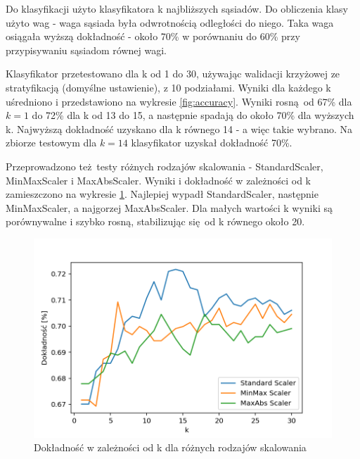 \documentclass[12pt]{article}
\begin{document}
Do klasyfikacji użyto klasyfikatora k najbliższych sąsiadów. Do obliczenia klasy użyto wag - waga sąsiada była odwrotnością odległości do niego. Taka waga osiągała wyższą dokładność - około 70\% w porównaniu do 60\% przy przypisywaniu sąsiadom równej wagi.

Klasyfikator przetestowano dla k od 1 do 30, używając walidacji krzyżowej ze stratyfikacją (domyślne ustawienie), z 10 podziałami. Wyniki dla każdego k uśredniono i przedstawiono na wykresie \ref{fig:accuracy}. Wyniki rosną od 67\% dla $k=1$ do 72\% dla k od 13 do 15, a następnie spadają do około 70\% dla wyższych k. Najwyższą dokładność uzyskano dla k równego 14 - a więc takie wybrano. Na zbiorze testowym dla $k=14$ klasyfikator uzyskał dokładność 70\%.

Przeprowadzono też testy różnych rodzajów skalowania - StandardScaler, MinMaxScaler i MaxAbsScaler. Wyniki i dokładność w zależności od k zamieszczono na wykresie \ref{fig:accuracy-scalers}. Najlepiej wypadł StandardScaler, następnie MinMaxScaler, a najgorzej MaxAbsScaler. Dla małych wartości k wyniki są porównywalne i szybko rosną, stabilizując się od k równego około 20.

\begin{figure}[htb!]
	\centering
	\includegraphics[width=0.7\columnwidth]{accuracy_scalers.png}
	\caption{Dokładność w zależności od k dla różnych rodzajów skalowania}
	\label{fig:accuracy-scalers}
\end{figure}
\end{document}
